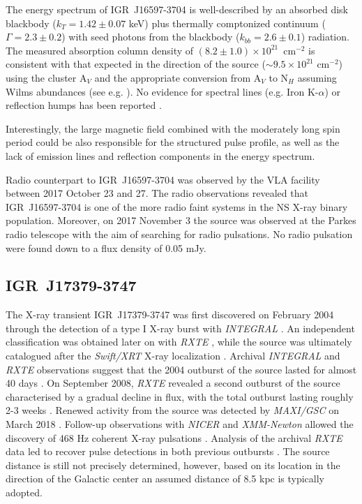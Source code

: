 \documentclass[graybox]{svmult}
\def \inte {{\em INTEGRAL\xspace}}
\def \xmm {{\em XMM-Newton\xspace}}
\def \rxte {{\em RXTE\xspace}}
\def \swiftxrt{{\em Swift/XRT\xspace}}
\def \nicer{{\em NICER\xspace}}
\def \maxigsc{{\em MAXI/GSC\xspace}}
\def \maxigsc{{\em MAXI/GSC\xspace}}
\begin{document}
The energy spectrum of IGR~J16597-3704 is  well-described by an absorbed disk blackbody ($k_T=1.42\pm0.07$ keV) plus thermally comptonized continuum ($\Gamma=2.3\pm0.2$) with seed 
photons from the blackbody ($k_{bb}=2.6\pm0.1$) radiation. The measured absorption column density 
of $(8.2\pm1.0)\times10^{21}$~cm$^{-2}$ is consistent with that expected in the direction of the source ($\sim 9.5\times10^{21}$ cm$^{-2}$) using the cluster A$_V$ \cite{Harris1996} and the appropriate conversion from A$_V$ to N$_H$ assuming Wilms abundances (see e.g. \cite{Bahramian2015,Foight2016}). No evidence for spectral lines (e.g. Iron K-$\alpha$) or reflection humps has been reported \cite{Sanna2018b}.

Interestingly, the large magnetic field combined with the moderately long spin period could be also responsible for the structured pulse profile, as well as the lack of emission lines and reflection components in the energy spectrum.

Radio counterpart to IGR~J16597-3704 was observed by the VLA facility between 2017 October 23 and 27. The radio observations revealed that IGR~J16597-3704 is one of the more radio faint systems in the NS X-ray binary population. Moreover, on 2017 November 3 the source was observed at the Parkes radio telescope with the aim of searching for radio pulsations. No radio pulsation were found down to a flux density of 0.05 mJy.

\subsection{IGR~J17379-3747}

The X-ray transient IGR~J17379-3747 was first discovered on February 2004 through the detection of a type I X-ray burst with \inte{} \cite{Chelovekov2006}. An independent classification was obtained later on with \rxte{} \cite{Markwardt2008}, while the source was ultimately catalogued after the \swiftxrt{} X-ray localization \cite{Bird2007,Krivonos2007,Krimm2008}. Archival \inte{} and \rxte{} observations suggest that the 2004 outburst of the source lasted for almost 40 days \cite{Markwardt2008,Chelovekov2010}. On September 2008, \rxte{} revealed a second outburst of the source characterised by a gradual decline in flux, with the total outburst lasting roughly 2-3 weeks \cite{Markwardt2008,Shaw2008}.
Renewed activity from the source was detected by \maxigsc{} on March 2018 \cite{Negoro2018}. Follow-up observations with \nicer{} and \xmm{} allowed the discovery of 468 Hz coherent X-ray pulsations \cite{Strohmayer2018b,Sanna2018b}. Analysis of the archival \rxte{} data led to recover pulse detections in both previous outbursts \cite{Sanna2018b}.
The source distance is still not precisely determined, however, based on its location in the direction of the Galactic center an assumed distance of 8.5 kpc is typically adopted. 
\end{document}
